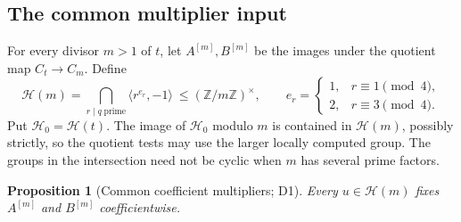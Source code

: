 \documentclass[11pt]{article}
\newtheorem{proposition}[theorem]{Proposition}
\theoremstyle{definition}
\theoremstyle{remark}
\begin{document}
\subsection{The common multiplier input}
\label{early-multipliers}

For every divisor $m>1$ of $t$, let $A^{[m]},B^{[m]}$ be the images under
the quotient map $C_t\longrightarrow C_m$. Define
\begin{equation}
 \mathcal H(m)=\bigcap_{r\mid q\;\text{prime}}
       \langle r^{e_r},-1\rangle\ \leq (\mathbb Z/m\mathbb Z)^\times,
 \qquad
 e_r=\begin{cases}1,&r\equiv1\pmod4,\\2,&r\equiv3\pmod4.\end{cases}
 \label{early-common-group}
\end{equation}
Put $\mathcal H_0=\mathcal H(t)$. The image of $\mathcal H_0$ modulo $m$
is contained in $\mathcal H(m)$, possibly strictly, so the quotient tests
may use the larger locally computed group. The groups in the intersection
need not be cyclic when $m$ has several prime factors.

\begin{proposition}[Common coefficient multipliers; D1]
\label{early-d1}
Every $u\in\mathcal H(m)$ fixes $A^{[m]}$ and $B^{[m]}$ coefficientwise.
\end{proposition}
\end{document}
